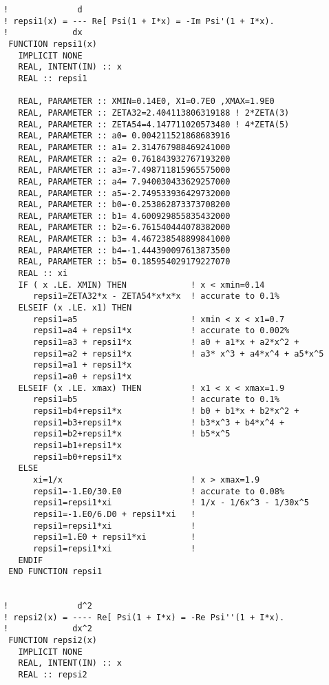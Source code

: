 \documentclass[preprint,12pt,eqsecnum,nofootinbib,amsmath,amssymb]{revtex4}
\begin{document}
{\begin{verbatim}
!              d
! repsi1(x) = --- Re[ Psi(1 + I*x) = -Im Psi'(1 + I*x). 
!             dx
 FUNCTION repsi1(x)  
   IMPLICIT NONE
   REAL, INTENT(IN) :: x
   REAL :: repsi1

   REAL, PARAMETER :: XMIN=0.14E0, X1=0.7E0 ,XMAX=1.9E0
   REAL, PARAMETER :: ZETA32=2.404113806319188 ! 2*ZETA(3)
   REAL, PARAMETER :: ZETA54=4.147711020573480 ! 4*ZETA(5)
   REAL, PARAMETER :: a0= 0.004211521868683916
   REAL, PARAMETER :: a1= 2.314767988469241000
   REAL, PARAMETER :: a2= 0.761843932767193200
   REAL, PARAMETER :: a3=-7.498711815965575000
   REAL, PARAMETER :: a4= 7.940030433629257000
   REAL, PARAMETER :: a5=-2.749533936429732000
   REAL, PARAMETER :: b0=-0.253862873373708200
   REAL, PARAMETER :: b1= 4.600929855835432000
   REAL, PARAMETER :: b2=-6.761540444078382000
   REAL, PARAMETER :: b3= 4.467238548899841000
   REAL, PARAMETER :: b4=-1.444390097613873500
   REAL, PARAMETER :: b5= 0.185954029179227070
   REAL :: xi
   IF ( x .LE. XMIN) THEN             ! x < xmin=0.14 
      repsi1=ZETA32*x - ZETA54*x*x*x  ! accurate to 0.1%
   ELSEIF (x .LE. x1) THEN
      repsi1=a5                       ! xmin < x < x1=0.7
      repsi1=a4 + repsi1*x            ! accurate to 0.002%
      repsi1=a3 + repsi1*x            ! a0 + a1*x + a2*x^2 +
      repsi1=a2 + repsi1*x            ! a3* x^3 + a4*x^4 + a5*x^5
      repsi1=a1 + repsi1*x
      repsi1=a0 + repsi1*x
   ELSEIF (x .LE. xmax) THEN          ! x1 < x < xmax=1.9
      repsi1=b5                       ! accurate to 0.1%
      repsi1=b4+repsi1*x              ! b0 + b1*x + b2*x^2 + 
      repsi1=b3+repsi1*x              ! b3*x^3 + b4*x^4 +
      repsi1=b2+repsi1*x              ! b5*x^5
      repsi1=b1+repsi1*x              
      repsi1=b0+repsi1*x            
   ELSE
      xi=1/x                          ! x > xmax=1.9
      repsi1=-1.E0/30.E0              ! accurate to 0.08%
      repsi1=repsi1*xi                ! 1/x - 1/6x^3 - 1/30x^5
      repsi1=-1.E0/6.D0 + repsi1*xi   ! 
      repsi1=repsi1*xi                !
      repsi1=1.E0 + repsi1*xi         !
      repsi1=repsi1*xi                !
   ENDIF
 END FUNCTION repsi1


!              d^2
! repsi2(x) = ---- Re[ Psi(1 + I*x) = -Re Psi''(1 + I*x). 
!             dx^2
 FUNCTION repsi2(x) 
   IMPLICIT NONE
   REAL, INTENT(IN) :: x
   REAL :: repsi2


\end{verbatim}}
\end{document}
